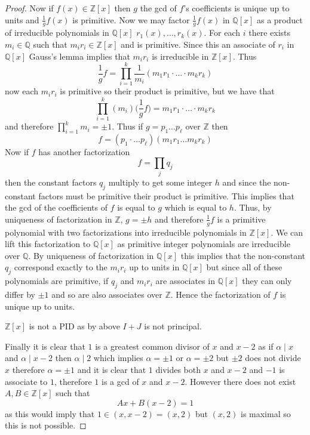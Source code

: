 \documentclass[12pt]{article}
\begin{document}
\begin{enumerate}
\begin{proof}
        Now if $f(x) \in \mathbb Z[x]$ then $g$ the gcd of $f$'s coefficients
        is unique up to units and $\frac{1}{g}f(x)$ is primitive. Now we may factor
        $\frac{1}{g}f(x)$ in $\mathbb Q[x]$ as a product of irreducible polynomials in $\mathbb Q[x]$
        $r_1(x), \ldots, r_k(x)$. For each $i$ there exists $m_i \in \mathbb Q$ such that $m_ir_i \in \mathbb Z[x]$
        and is primitive. Since this an associate of $r_i$ in $\mathbb Q[x]$ Gauss's lemma implies that
        $m_ir_i$ is irreducible in $\mathbb Z[x]$. Thus
        \[ \frac{1}{g}f = \prod_{i = 1}^k \frac{1}{m_i}(m_1r_1\cdot \ldots \cdot m_kr_k) \]
        now each $m_ir_i$ is primitive so their product is primitive, but we have that
        \[ \prod_{i = 1}^k(m_i)\Big(\frac{1}{g}f) = m_1r_1\cdot \ldots \cdot m_kr_k \]
        and therefore $\prod_{i = 1}^km_i = \pm 1$. Thus if $g = p_1\ldots p_\ell$ over $\mathbb Z$ then
        \[ f = (p_1\cdot \ldots p_\ell)(m_1r_1 \ldots m_kr_k) \]
        Now if $f$ has another factorization
        \[ f = \prod_{j}q_j \]
        then the constant factors $q_j$ multiply to get some integer $h$
        and since the non-constant factors must be primitive their product is primitive. This implies that
        the gcd of the coefficients of $f$ is equal to $g$ which is equal to $h$.
        Thus, by uniqueness of factorization in $\mathbb Z$, $g = \pm h$ and therefore
        $\frac{1}{g}f$ is a primitive polynomial with two factorizations into irreducible polynomials
        in $\mathbb Z[x]$. We can lift this factorization to $\mathbb Q[x]$ as primitive integer polynomials
        are irreducible over $\mathbb Q$. By uniqueness of factorization in $\mathbb Q[x]$
        this implies that the non-constant $q_j$ correspond exactly to the $m_ir_i$ up to units in $\mathbb Q[x]$
        but since all of these polynomials are primitive, if $q_j$ and $m_ir_i$ are associates in $\mathbb Q[x]$ they can only differ by $\pm 1$
        and so are also associates over $\mathbb Z$. Hence the factorization of $f$ is unique up to units.

        $\mathbb Z[x]$ is not a PID as by above $I + J$ is not principal.

        Finally it is clear that $1$ is a greatest common divisor of $x$ and $x - 2$
        as if $\alpha \mid x$ and $\alpha \mid x-2$ then $\alpha \mid 2$ which implies $\alpha = \pm 1$
        or $\alpha =  \pm 2$ but $\pm 2$ does not divide $x$ therefore $\alpha = \pm 1$
        and it is clear that $1$ divides both $x$ and $x-2$ and $-1$ is associate to $1$, therefore
        $1$ is a gcd of $x$ and $x-2$. 
        However there does not exist $A, B \in \mathbb Z[x]$
        such that
        \[ Ax + B(x - 2) = 1 \]
        as this would imply that $1 \in (x, x-2) = (x, 2)$ but $(x, 2)$ is maximal so this is not possible.
    \end{proof}
\end{enumerate}
\end{document}
